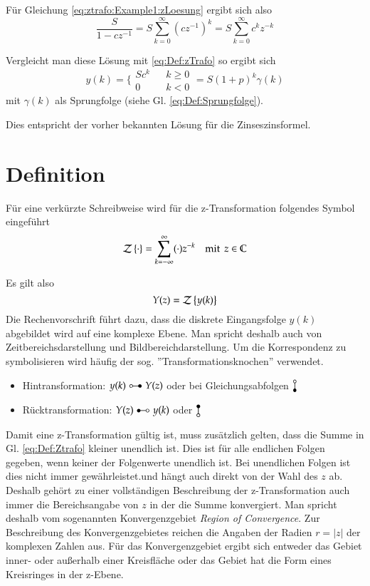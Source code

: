 Für Gleichung \ref{eq:ztrafo:Example1:zLoesung} ergibt sich also
\begin{equation}\label{eq:zTrafo:Example1:kLoesung1}
    \frac{S}{1-c z^{-1}} = S \sum_{k = 0}^{\infty} (c z^{-1})^k = S \sum_{k = 0}^{\infty} c^k z^{-k}
\end{equation}

Vergleicht man diese Lösung mit \ref{eq:Def:zTrafo} so ergibt sich
\begin{equation}\label{eq:zTrafo:Example1:kLoesung2}
    y(k) = \bigg\{ \begin{array}{lcc}
      S c^k & & k \geq 0\\
        0  & & k<0
    \end{array} = S(1+p)^k \gamma(k)
\end{equation}
mit $\gamma(k)$ als Sprungfolge (siehe Gl.
\ref{eq:Def:Sprungfolge}).

Dies entspricht der vorher bekannten Lösung für die
Zinseszinsformel.


\section{Definition}
Für eine verkürzte
Schreibweise wird für die z-Transformation folgendes Symbol eingeführt
\begin{equation}\label{eq:Def:Ztrafo}
    {\cal Z}\left\{ \cdot \right\}= \sum_{k = -\infty}^{\infty} (\cdot) z^{-k} \quad\mathrm{mit}\;\, z \in \mathbb{C}
\end{equation}

Es gilt also
\begin{equation}\label{eq:yExample}
    Y(z) ={\cal Z}\left\{y(k)\right\}
\end{equation}
Die Rechenvorschrift führt dazu, dass die diskrete Eingangsfolge
$y(k)$ abgebildet wird auf eine komplexe Ebene. Man spricht
deshalb auch von Zeitbereichsdarstellung und
Bildbereichdarstellung. Um die Korrespondenz zu symbolisieren wird
häufig der sog. ''Transformationsknochen'' verwendet.
\begin{itemize}
    \item Hintransformation: $y(k)\HinTrans Y(z)$ oder bei Gleichungsabfolgen $\HinTransV$
    \item Rücktransformation: $Y(z) \RueckTrans y(k)$ oder $\RueckTransV$
\end{itemize}

Damit eine z-Transformation gültig ist, muss zusätzlich gelten,
dass die Summe in Gl. \ref{eq:Def:Ztrafo} kleiner unendlich ist.
Dies ist für alle endlichen Folgen gegeben, wenn
keiner der Folgenwerte unendlich ist. Bei unendlichen Folgen ist dies
nicht immer gewährleistet.und hängt auch
direkt von der Wahl des $z$ ab. Deshalb gehört zu einer
vollständigen Beschreibung der z-Transformation auch immer die
Bereichsangabe von $z$ in der die Summe konvergiert. Man spricht deshalb vom sogenannten
Konvergenzgebiet {\em Region of Convergence}.
Zur Beschreibung des Konvergenzgebietes reichen die
Angaben der Radien $r = |z|$ der komplexen Zahlen aus. Für das
Konvergenzgebiet ergibt sich entweder das Gebiet inner- oder außerhalb einer
Kreisfläche oder das Gebiet hat die Form eines Kreisringes in der z-Ebene.

